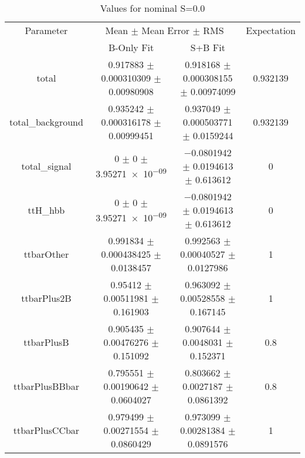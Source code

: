 \begin{table}
\centering
\caption{Values for nominal S=0.0}
\begin{tabular}{cccc}
\toprule
Parameter & \multicolumn{2}{c}{Mean $\pm$ Mean Error $\pm$ RMS} & Expectation\\
 & B-Only Fit & S+B Fit & \\
\midrule
total & \num{0.917883} $\pm$ \num{0.000310309} $\pm$ \num{0.00980908} & \num{0.918168} $\pm$ \num{0.000308155} $\pm$ \num{0.00974099} & \num{0.932139}\\
total\_background & \num{0.935242} $\pm$ \num{0.000316178} $\pm$ \num{0.00999451} & \num{0.937049} $\pm$ \num{0.000503771} $\pm$ \num{0.0159244} & \num{0.932139}\\
total\_signal & \num{0} $\pm$ \num{0} $\pm$ \num{3.95271e-09} & \num{-0.0801942} $\pm$ \num{0.0194613} $\pm$ \num{0.613612} & \num{0}\\
ttH\_hbb & \num{0} $\pm$ \num{0} $\pm$ \num{3.95271e-09} & \num{-0.0801942} $\pm$ \num{0.0194613} $\pm$ \num{0.613612} & \num{0}\\
ttbarOther & \num{0.991834} $\pm$ \num{0.000438425} $\pm$ \num{0.0138457} & \num{0.992563} $\pm$ \num{0.00040527} $\pm$ \num{0.0127986} & \num{1}\\
ttbarPlus2B & \num{0.95412} $\pm$ \num{0.00511981} $\pm$ \num{0.161903} & \num{0.963092} $\pm$ \num{0.00528558} $\pm$ \num{0.167145} & \num{1}\\
ttbarPlusB & \num{0.905435} $\pm$ \num{0.00476276} $\pm$ \num{0.151092} & \num{0.907644} $\pm$ \num{0.0048031} $\pm$ \num{0.152371} & \num{0.8}\\
ttbarPlusBBbar & \num{0.795551} $\pm$ \num{0.00190642} $\pm$ \num{0.0604027} & \num{0.803662} $\pm$ \num{0.0027187} $\pm$ \num{0.0861392} & \num{0.8}\\
ttbarPlusCCbar & \num{0.979499} $\pm$ \num{0.00271554} $\pm$ \num{0.0860429} & \num{0.973099} $\pm$ \num{0.00281384} $\pm$ \num{0.0891576} & \num{1}\\
\bottomrule
\end{tabular}
\end{table}